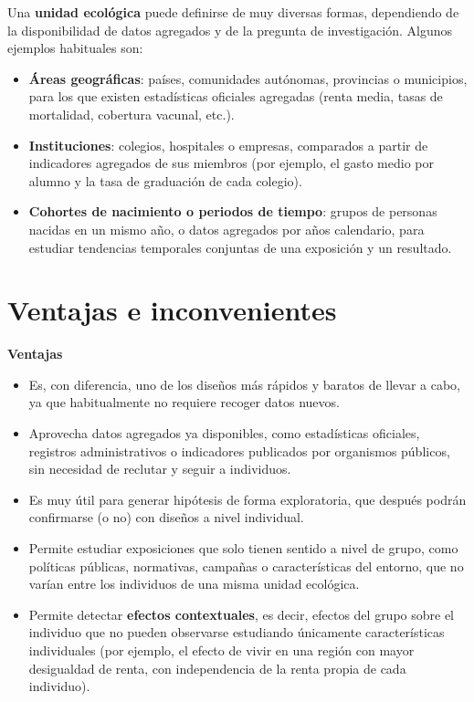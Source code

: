 \documentclass[
  spanish,
  a4paper,
]{scrreport}
\providecommand{\tightlist}{%
  \setlength{\itemsep}{0pt}\setlength{\parskip}{0pt}}
\theoremstyle{definition}
\theoremstyle{definition}
\theoremstyle{remark}
\begin{document}
Una \textbf{unidad ecológica} puede definirse de muy diversas formas,
dependiendo de la disponibilidad de datos agregados y de la pregunta de
investigación. Algunos ejemplos habituales son:

\begin{itemize}
\tightlist
\item
  \textbf{Áreas geográficas}: países, comunidades autónomas, provincias
  o municipios, para los que existen estadísticas oficiales agregadas
  (renta media, tasas de mortalidad, cobertura vacunal, etc.).
\item
  \textbf{Instituciones}: colegios, hospitales o empresas, comparados a
  partir de indicadores agregados de sus miembros (por ejemplo, el gasto
  medio por alumno y la tasa de graduación de cada colegio).
\item
  \textbf{Cohortes de nacimiento o periodos de tiempo}: grupos de
  personas nacidas en un mismo año, o datos agregados por años
  calendario, para estudiar tendencias temporales conjuntas de una
  exposición y un resultado.
\end{itemize}

\section{Ventajas e inconvenientes}\label{ventajas-e-inconvenientes-4}

\textbf{Ventajas}

\begin{itemize}
\tightlist
\item
  Es, con diferencia, uno de los diseños más rápidos y baratos de llevar
  a cabo, ya que habitualmente no requiere recoger datos nuevos.
\item
  Aprovecha datos agregados ya disponibles, como estadísticas oficiales,
  registros administrativos o indicadores publicados por organismos
  públicos, sin necesidad de reclutar y seguir a individuos.
\item
  Es muy útil para generar hipótesis de forma exploratoria, que después
  podrán confirmarse (o no) con diseños a nivel individual.
\item
  Permite estudiar exposiciones que solo tienen sentido a nivel de
  grupo, como políticas públicas, normativas, campañas o características
  del entorno, que no varían entre los individuos de una misma unidad
  ecológica.
\item
  Permite detectar \textbf{efectos contextuales}, es decir, efectos del
  grupo sobre el individuo que no pueden observarse estudiando
  únicamente características individuales (por ejemplo, el efecto de
  vivir en una región con mayor desigualdad de renta, con independencia
  de la renta propia de cada individuo).
\end{itemize}
\end{document}
